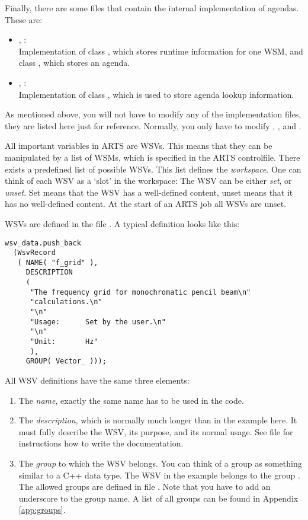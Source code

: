 Finally, there are some files that contain the internal implementation
of agendas. These are:
\begin{itemize}
\item {}, :\\
  Implementation of class , which stores runtime
  information for one WSM, and class , which stores
  an agenda.
\item {}, :\\
  Implementation of class , which is used to store
  agenda lookup information.
\end{itemize}
  

\vspace{2ex} As mentioned above, you will not have to modify any of
the implementation files, they are listed here just for reference.
Normally, you only have to modify ,
, and .

\label{sec:agendas:wsvs}

All important variables in ARTS are WSVs. This means that they can be
manipulated by a list of WSMs, which is specified in the ARTS
controlfile. There exists a predefined list of possible WSVs. This
list defines the \emph{workspace}. One can think of each WSV as a
`slot' in the workspace: The WSV can be either \emph{set}, or
\emph{unset}. Set means that the WSV has a well-defined content, unset
means that it has no well-defined content. At the start of an ARTS job
all WSVs are unset.

WSVs are defined in the file . A typical
definition looks like this:

{\small
\begin{verbatim}
wsv_data.push_back
  (WsvRecord
   ( NAME( "f_grid" ),
     DESCRIPTION
     (
      "The frequency grid for monochromatic pencil beam\n"
      "calculations.\n"
      "\n"
      "Usage:      Set by the user.\n"
      "\n"
      "Unit:       Hz"
      ),
     GROUP( Vector_ )));
\end{verbatim}
}

\noindent
All WSV definitions have the same three elements:
\begin{enumerate}
\item The \emph{name}, exactly the
  same name has to be used in the code.
\item The \emph{description}, which is normally much longer than in
  the example here. It must fully describe the WSV, its purpose, and
  its normal usage. See file  for instructions
  how to write the documentation.
\item The \emph{group} to which the WSV belongs. You can think of a
  group as something similar to a C++ data type. The WSV in the
  example belongs to the group . The allowed groups
  are defined in file . Note that you have to add
  an underscore to the group name. A list of all groups can be found
  in Appendix \ref{app:groups}.
\end{enumerate}

